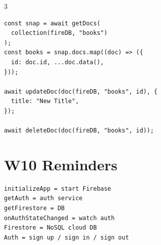 \documentclass[8pt,letterpaper]{extarticle}
\begin{document}
\begin{multicols}{3}
\begin{lstlisting}
const snap = await getDocs(
  collection(fireDB, "books")
);
const books = snap.docs.map((doc) => ({
  id: doc.id, ...doc.data(),
}));

await updateDoc(doc(fireDB, "books", id), {
  title: "New Title",
});

await deleteDoc(doc(fireDB, "books", id));
\end{lstlisting}

\section*{W10 Reminders}
\begin{lstlisting}
initializeApp = start Firebase
getAuth = auth service
getFirestore = DB
onAuthStateChanged = watch auth
Firestore = NoSQL cloud DB
Auth = sign up / sign in / sign out
\end{lstlisting}

\end{multicols}
\end{document}
